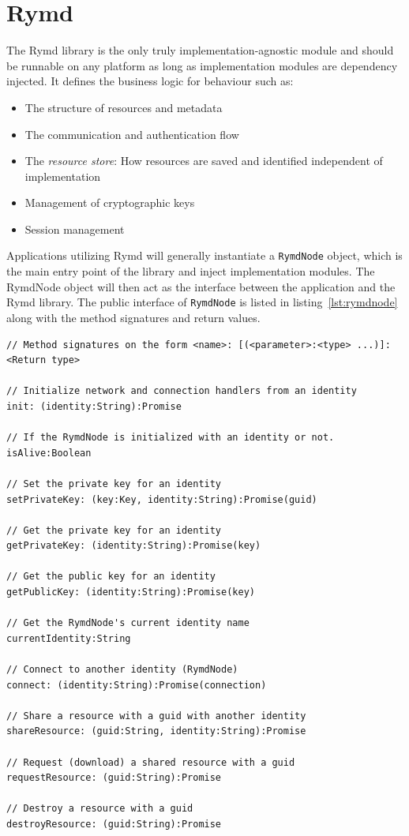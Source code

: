 \section{Rymd}
\label{sec:rymd}

The Rymd library is the only truly implementation-agnostic module and should be runnable on any platform as long as implementation modules are dependency injected. It defines the business logic for behaviour such as:

\begin{itemize}
  \item The structure of resources and metadata
  \item The communication and authentication flow
  \item The \emph{resource store}: How resources are saved and identified independent of implementation
  \item Management of cryptographic keys
  \item Session management
\end{itemize}

Applications utilizing Rymd will generally instantiate a \texttt{RymdNode} object, which is the main entry point of the library and inject implementation modules. The RymdNode object will then act as the interface between the application and the Rymd library. The public interface of \texttt{RymdNode} is listed in listing~\ref{lst:rymdnode} along with the method signatures and return values.

\begin{Code}
\begin{lstlisting}[caption={Public methods of \texttt{RymdNode}}, label={lst:rymdnode}]
// Method signatures on the form <name>: [(<parameter>:<type> ...)]:<Return type>

// Initialize network and connection handlers from an identity
init: (identity:String):Promise

// If the RymdNode is initialized with an identity or not.
isAlive:Boolean

// Set the private key for an identity
setPrivateKey: (key:Key, identity:String):Promise(guid)

// Get the private key for an identity
getPrivateKey: (identity:String):Promise(key)

// Get the public key for an identity
getPublicKey: (identity:String):Promise(key)

// Get the RymdNode's current identity name
currentIdentity:String

// Connect to another identity (RymdNode)
connect: (identity:String):Promise(connection)

// Share a resource with a guid with another identity
shareResource: (guid:String, identity:String):Promise

// Request (download) a shared resource with a guid
requestResource: (guid:String):Promise

// Destroy a resource with a guid
destroyResource: (guid:String):Promise
\end{lstlisting}
\end{Code}

